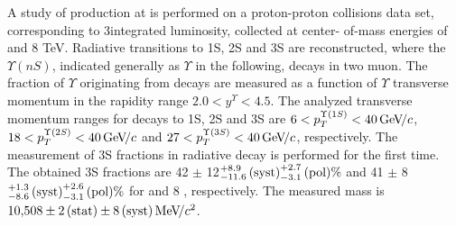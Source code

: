 A study of \chib production at \lhcb is performed on a proton-proton collisions
data set, corresponding to 3\invfb integrated luminosity, collected at center-
of-mass energies of  and 8 TeV. Radiative \chib transitions to
\Y1S, \Y2S and \Y3S are reconstructed, where the $\Upsilon(nS)$, indicated generally as $\Upsilon$ in the following, decays in two muon. 
The fraction of $\Upsilon$ originating from \chib decays
are measured as a function of $\Upsilon$ transverse momentum in the \lhcb rapidity range
$2.0 < y^{\Upsilon} < 4.5$. The analyzed transverse momentum ranges for decays
to \Y1S, \Y2S and \Y3S are $6<p_T^{\Y1S}<40\gevc$, $18<p_T^{\Y2S}<40\gevc$ and
$27<p_T^{\Y3S}<40\gevc$, respectively. The measurement of
\Y3S fractions in radiative \chibThreeP decay is performed for the first time.
The obtained \Y3S fractions are 42 $\pm$ 12\stat${}^{+8.9}_{-11.6}\mathrm{\,(syst)}^{+2.7}_{-3.1}\mathrm{\,(pol)} \%$ and 41 $\pm$ 8\stat${}^{+1.3}_{-8.6}\mathrm{\,(syst)}^{+2.6}_{-3.1}\mathrm{\,(pol)} \%$ for  and 8 \tev, respectively. The measured \chiboneThreeP mass is $10{,}508 \pm 2\mathrm{\,(stat)} \pm
8\mathrm{\,(syst)} {\mathrm{\,Me\kern -0.1em V\!/}c^2}$.

